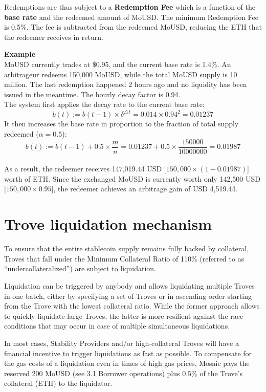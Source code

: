 \documentclass{article}
\begin{document}
Redemptions are thus subject to a \textbf{Redemption Fee} which is a function of the \textbf{base rate} and the redeemed amount of MoUSD. The minimum Redemption Fee is 0.5\%. The fee is subtracted from the redeemed MoUSD, reducing the ETH that the redeemer receives in return.\\
\begin{tcolorbox}
\textbf{Example}\\
MoUSD currently trades at \$0.95, and the current base rate is 1.4\%. An arbitrageur redeems 150,000 MoUSD, while the total MoUSD supply is 10 million. The last redemption happened 2 hours ago and no liquidity has been issued in the meantime. The hourly decay factor is 0.94.\\

The system first applies the decay rate to the current base rate:
$$b(t):=b(t-1)\times\delta^{\triangle t}=0.014\times0.94^2=0.01237$$
It then increases the base rate in proportion to the fraction of total supply redeemed ($\alpha= 0.5$):
$$b(t):=b(t-1)+0.5\times\frac{m}{n}=0.01237+0.5\times\frac{150000}{10000000}=0.01987$$
\\

As a result, the redeemer receives 147,019.44 USD [$150,000 \times (1 - 0.01987)$] worth of ETH. Since the exchanged MoUSD is currently worth only 142,500 USD [$150,000 \times 0.95$], the redeemer achieves an arbitrage gain of USD 4,519.44.
\end{tcolorbox}

\section{Trove liquidation mechanism}
To ensure that the entire stablecoin supply remains fully backed by collateral, Troves that fall under the Minimum Collateral Ratio of 110\% (referred to as “undercollateralized”) are subject to liquidation.

Liquidation can be triggered by anybody and allows liquidating multiple Troves in one batch, either by specifying a set of Troves or in ascending order starting from the Trove with the lowest collateral ratio. While the former approach allows to quickly liquidate large Troves, the latter is more resilient against the race conditions that may occur in case of multiple simultaneous liquidations.

In most cases, Stability Providers and/or high-collateral Troves will have a financial incentive to trigger liquidations as fast as possible. To compensate for the gas costs of a liquidation even in times of high gas prices, Mosaic pays the reserved 200 MoUSD (see 3.1 Borrower operations) plus 0.5\% of the Trove’s collateral (ETH) to the liquidator.
\\
\end{document}
